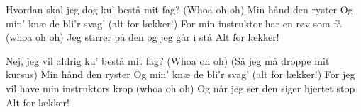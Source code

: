 \documentclass[a4paper,11pt]{article}
\begin{document}
\begin{song}
 Hvordan skal jeg dog ku' bestå mit fag? (Whoa oh oh)
Min hånd den ryster
Og min' knæ de bli'r svag' (alt for lækker!)
For min instruktor har en røv som få (whoa oh oh)
Jeg stirrer på den og jeg går i stå
 Alt for lækker!

 Nej, jeg vil aldrig ku' bestå mit fag? (Whoa oh oh)
 (Så jeg må droppe mit kursus)
 Min hånd den ryster
Og min' knæ de bli'r svag' (alt for lækker!)
For jeg vil have min instruktors krop (whoa oh oh)
Og når jeg ser den siger hjertet stop
Alt for lækker!
\end{song}
\end{document}

